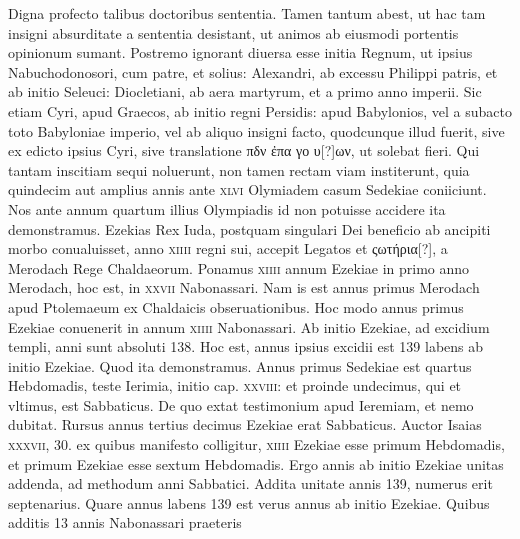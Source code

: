 Digna profecto
talibus doctoribus sententia.
Tamen tantum abest, ut hac tam insigni
absurditate a sententia desistant, ut animos ab eiusmodi portentis
opinionum sumant.
Postremo ignorant diuersa esse initia Regnum,
ut ipsius Nabuchodonosori, cum patre, et solius: Alexandri,
ab excessu Philippi patris, et ab initio Seleuci: Diocletiani, ab aera
martyrum, et a primo anno imperii.
Sic etiam Cyri, apud Graecos, ab
initio regni Persidis: apud Babylonios, vel a subacto toto Babyloniae
imperio, vel ab aliquo insigni facto, quodcunque illud fuerit, sive
ex edicto ipsius Cyri, sive translatione \textgreek{πδν ἐπα γο υ[?]ων},
ut solebat fieri.
Qui tantam inscitiam sequi noluerunt, non tamen rectam viam
institerunt, quia quindecim aut amplius annis ante \textsc{xlvi} Olymiadem
casum Sedekiae coniiciunt.
Nos ante annum quartum illius
Olympiadis id non potuisse accidere ita demonstramus. 
Ezekias
Rex Iuda, postquam singulari Dei beneficio ab ancipiti morbo conualuisset,
anno \textsc{xiiii} regni sui, accepit Legatos et \textgreek{ςωτήρια[?]}, a
Merodach Rege Chaldaeorum.
Ponamus \textsc{xiiii} annum Ezekiae in
primo anno Merodach, hoc est, in \textsc{xxvii} Nabonassari.
Nam is est
annus primus Merodach apud Ptolemaeum ex Chaldaicis obseruationibus. 
Hoc modo annus primus Ezekiae conuenerit in annum
\textsc{xiiii} Nabonassari.
Ab initio Ezekiae, ad excidium templi, anni
sunt absoluti 138.
Hoc est, annus ipsius excidii est 139 labens ab initio
Ezekiae.
Quod ita demonstramus. 
Annus primus Sedekiae est
quartus Hebdomadis, teste Ierimia, initio cap. \textsc{xxviii}: et proinde
undecimus, qui et vltimus, est Sabbaticus. 
De quo extat testimonium
apud Ieremiam, et nemo dubitat.
Rursus annus tertius decimus
Ezekiae erat Sabbaticus. 
Auctor Isaias \textsc{xxxvii}, 30.
 ex quibus
manifesto colligitur, \textsc{xiiii} Ezekiae esse primum Hebdomadis, et primum
Ezekiae esse sextum Hebdomadis. 
Ergo annis ab initio Ezekiae unitas addenda, ad methodum anni Sabbatici.
Addita unitate annis
139, numerus erit septenarius. 
Quare annus labens 139 est verus
annus ab initio Ezekiae.
Quibus additis 13 annis Nabonassari praeteris
